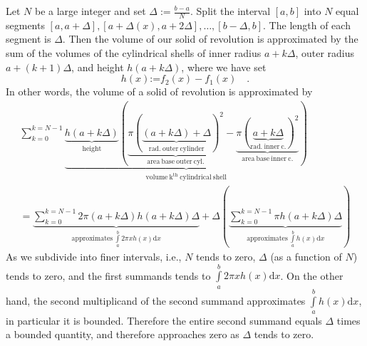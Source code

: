 \documentclass[12pt]{book}
\newcommand{\diff}{\text{d}}
\newcommand{\eqdef}{\textbf{:=}}
\newcommand{\optionalDisplay}[1]{}
\begin{document}
\optionalDisplay{
\psset{xunit=2cm,yunit=2cm}
\psset{lightsrc=50 20 20,viewpoint=100 45 30 rtp2xyz,Decran=110,linewidth=0.2pt}

\begin{pspicture*}(-1,-1)(1,1)
\defFunction[algebraic]{innerC}(t)
{cos(t)}{sin(t)}{}
\defFunction[algebraic]{outerC}(t)
{1.1*cos(t)}{1.1*sin(t)}{}
\psSolid[object=prisme,h=0.6,
fillcolor=red,
resolution=30,
base=0 6.3 {outerC} CourbeR2+
6.3  0 {innerC} CourbeR2+](0,0,-0.6)
\psline[linecolor=black, linewidth=0.3pt, arrows={|-|}] (0,0.4) (0.55,0.4)
\psline[linecolor=black, linewidth=0.3pt, arrows={|-|}] (0,0.7) (0.607,0.7)
\rput(0.25, 0.52 ){\tiny $r$}
\rput(0.30, 0.82 ){\tiny $r+\Delta$}
\psline[linecolor=black, linewidth=0.3pt, arrows={|-|}] (0.7,0) (0.7,-0.3)
\rput[l](0.75, -0.15 ){\tiny $h$}
\end{pspicture*}
}

Let $N$ be a large integer and set $\Delta:= \frac{b-a}{N}$. Split the interval $[a,b]$ into $N$ equal segments $[a,a+\Delta],[a+\Delta(x),a+2\Delta],\dots, [b-\Delta, b]$. The length of each segment is $\Delta$. Then the volume of our solid of revolution is approximated by the sum of the volumes of the cylindrical shells of inner radius $a+ k\Delta $, outer radius $a+(k+1)\Delta$, and height $h(a+k\Delta)$, where we have set 
\[
h(x)\eqdef f_2(x)-f_1(x)\quad .
\]
In other words, the volume of a solid of revolution is approximated by
\[
\begin{array}{l}
\displaystyle\sum_{k=0}^{k=N-1} \underbrace{ \underbrace{h(a+k\Delta)}_{\mathrm{height}}(\underbrace{\pi (\underbrace{(a+k\Delta)+\Delta}_{ \mathrm{rad.~outer~cylinder}} ) ^2}_{\mathrm{area~base~outer~cyl.}}-\underbrace{\pi (\underbrace{a+k \Delta}_{\mathrm{rad.~inner~c.}})^2}_{\mathrm{area~base~inner~c.}})}_{\mathrm{volume~k^{th}~cylindrical~shell}} \\
=\displaystyle \underbrace{\sum_{k=0}^{k=N-1} 2\pi(a+k\Delta)  h(a+k\Delta) \Delta }_{\mathrm{approximates~} \int\limits_{a}^b 2\pi x h(x) \diff x }  + \Delta \left(\underbrace{\sum_{k=0}^{k=N-1} \pi  h(a+k\Delta)\Delta}_{\mathrm{approximates~} \int\limits_{a}^b h(x) \diff x }\right)
\end{array}
\]
As we subdivide into finer intervals, i.e., $N$ tends to zero, $\Delta$ (as a function of $N$) tends to zero, and the first summands tends to $\int\limits_{a}^b 2\pi x h(x) \diff x $. On the other hand, the second multiplicand of the second summand approximates $\int\limits_{a}^b h(x) \diff x $, in particular it is bounded. Therefore the entire second summand equals $\Delta$ times a bounded quantity, and therefore approaches zero as $\Delta$ tends to zero.
\end{document}

